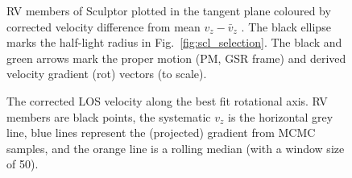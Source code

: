 \begin{figure}
\centering
{}
\caption[Scl velocity sample]{RV members of Sculptor plotted in the
tangent plane coloured by corrected velocity difference from mean
\(v_z - \bar v_z\) . The black ellipse marks the half-light radius in
Fig.~\ref{fig:scl_selection}. The black and green arrows mark the proper
motion (PM, GSR frame) and derived velocity gradient (rot) vectors (to
scale).}
\end{figure}

\begin{figure}
\centering
{}
\caption[Scl velocity gradient]{The corrected LOS velocity along the
best fit rotational axis. RV members are black points, the systematic
\(v_z\) is the horizontal grey line, blue lines represent the
(projected) gradient from MCMC samples, and the orange line is a rolling
median (with a window size of 50).}
\end{figure}
